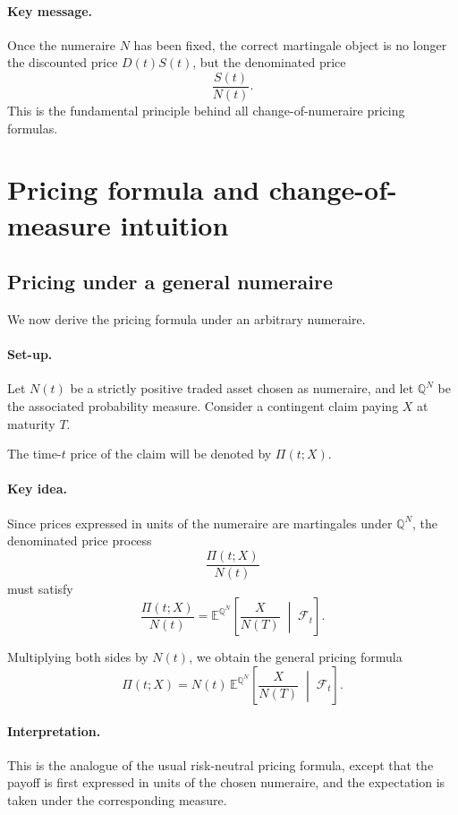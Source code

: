 \documentclass[11pt]{article}
\newcommand{\Qbb}{\mathbb{Q}}
\newcommand{\E}{\mathbb{E}}
\theoremstyle{definition}
\theoremstyle{plain}
\begin{document}
\paragraph{Key message.}
Once the numeraire \(N\) has been fixed, the correct martingale object
is no longer the discounted price \(D(t)S(t)\), but the denominated
price
\[
\frac{S(t)}{N(t)}.
\]
This is the fundamental principle behind all change-of-numeraire pricing
formulas.

\section{Pricing formula and change-of-measure intuition}

\subsection{Pricing under a general numeraire}

We now derive the pricing formula under an arbitrary numeraire.

\paragraph{Set-up.}
Let \(N(t)\) be a strictly positive traded asset chosen as numeraire, and
let \(\Qbb^N\) be the associated probability measure.
Consider a contingent claim paying \(X\) at maturity \(T\).

The time-\(t\) price of the claim will be denoted by \(\Pi(t;X)\).

\paragraph{Key idea.}
Since prices expressed in units of the numeraire are martingales under
\(\Qbb^N\), the denominated price process
\[
\frac{\Pi(t;X)}{N(t)}
\]
must satisfy
\[
\frac{\Pi(t;X)}{N(t)}
=
\E^{\Qbb^N}\!\left[
\frac{X}{N(T)}
\;\middle|\;
\mathcal{F}_t
\right].
\]

Multiplying both sides by \(N(t)\), we obtain the general pricing
formula
\[
\boxed{
\Pi(t;X)
=
N(t)\,
\E^{\Qbb^N}\!\left[
\frac{X}{N(T)}
\;\middle|\;
\mathcal{F}_t
\right].
}
\]

\paragraph{Interpretation.}
This is the analogue of the usual risk-neutral pricing formula, except
that the payoff is first expressed in units of the chosen numeraire,
and the expectation is taken under the corresponding measure.
\end{document}
